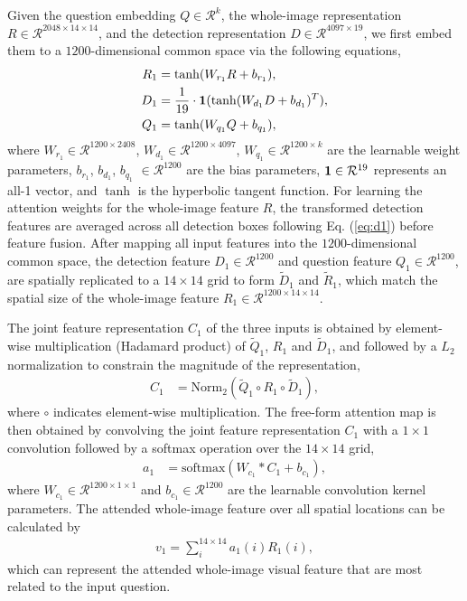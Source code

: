 \documentclass[letterpaper]{article}
\begin{document}
{Given the question embedding $Q \in \mathcal{R}^k$, the whole-image representation $R \in \mathcal{R}^{2048 \times 14 \times 14}$, and the detection representation $D \in \mathcal{R}^{4097 \times 19}$, we first embed them to a $1200$-dimensional common space via the following equations,
\begin{align}
R_1 & = \tanh(W_{r_1} R + b_{r_1}), \\
D_1 & = \frac{1}{19} \cdot {\bf 1} (\tanh(W_{d_1}D+b_{d_1})^T) \label{eq:d1}, \\
Q_1 & = \tanh(W_{q_1}Q+b_{q_1}),
\end{align}
where $W_{r_1} \in  \mathcal{R}^{1200 \times 2408}$, $W_{d_1} \in  \mathcal{R}^{1200 \times 4097}$, $W_{q_1} \in  \mathcal{R}^{1200 \times k}$ are the learnable weight parameters, $b_{r_1}$, $b_{d_1}$, $b_{q_1}$ $ \in  \mathcal{R}^{1200}$ are the bias parameters, ${\bf 1} \in \mathcal{R}^{19}$ represents an all-1 vector, and $\tanh$ is the hyperbolic tangent function. For learning the attention weights for the whole-image feature $R$, the transformed detection features are averaged across all detection boxes following Eq. (\ref{eq:d1}) before feature fusion. After mapping all input features into the $1200$-dimensional common space, the detection feature $D_1 \in \mathcal{R}^{1200}$ and question feature $Q_1 \in \mathcal{R}^{1200}$, are spatially replicated to a $14\times 14$ grid to form $\tilde{D}_1$ and $\tilde{R}_1$, which match the spatial size of the whole-image feature $R_1 \in \mathcal{R}^{1200\times 14 \times 14}$.

The joint feature representation $C_1$ of the three inputs is obtained by element-wise multiplication (Hadamard product) of $\tilde{Q}_1$, $R_1$ and $\tilde{D}_1$, and followed by a $L_2$ normalization to constrain the magnitude of the representation,
\begin{align}
C_1 & =  \mathrm{Norm_2} (\tilde{Q}_1 \circ R_1 \circ \tilde{D}_1), \label{eq:c1} 
\end{align}
where $\circ$ indicates element-wise multiplication. The free-form attention map is then obtained by convolving the joint feature representation $C_1$ with a $1\times 1$ convolution followed by a softmax operation over the $14\times 14$ grid,
\begin{align}
a_1 & = \mathrm{softmax}(W_{c_1} * C_1+b_{c_1}),
\end{align}
where $W_{c_1} \in \mathcal{R}^{1200 \times 1 \times 1}$ and $b_{c_1} \in  \mathcal{R}^{1200}$ are the learnable convolution kernel parameters. The attended whole-image feature over all spatial locations can be calculated by
\begin{align}
v_1  =  \sum_{i}^{14\times 14} a_1(i) R_1(i),
\end{align}
which can represent the attended whole-image visual feature that are most related to the input question.



}
\end{document}

